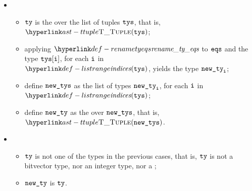 \begin{itemize}
  \item {}
  \begin{itemize}
    \item $\texttt{ty}$ is the \tupletypeterm{} over the list of tuples $\texttt{tys}$, that is, $\TTuple(\tys)$;
    \item applying $\renametyeqs$ to $\texttt{eqs}$ and the type $\texttt{tys}[\texttt{i}]$, for each $\texttt{i}$ in \\
          $\listrange(\tys)$, yields the type $\texttt{new\_ty}_{\texttt{i}}$;
    \item define $\texttt{new\_tys}$ as the list of types $\texttt{new\_ty}_{\texttt{i}}$, for each $\texttt{i}$ in $\listrange(\tys)$;
    \item define $\texttt{new\_ty}$ as the \tupletypeterm{} over $\texttt{new\_tys}$, that is, $\TTuple(\newtys)$.
  \end{itemize}

  \item {}
  \begin{itemize}
    \item $\texttt{ty}$ is not one of the types in the previous cases,
          that is, $\texttt{ty}$ is not a bitvector type, nor an integer type, nor a \tupletypeterm{};
    \item $\texttt{new\_ty}$ is $\texttt{ty}$.
  \end{itemize}
\end{itemize}

\FormallyParagraph
{}

